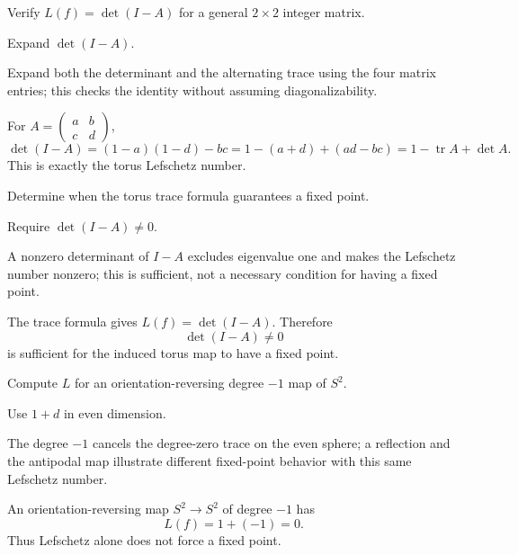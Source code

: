 \begin{exercise}\label{exr:viii35-15}
Verify $L(f)=\det(I-A)$ for a general $2\times2$ integer matrix.
\end{exercise}
\begin{hint}
Expand $\det(I-A)$.

Expand both the determinant and the alternating trace using the four matrix entries; this checks the identity without assuming diagonalizability.
\end{hint}
\begin{solution}
For \(A=\begin{pmatrix}a&b\\c&d\end{pmatrix}\),
\[
\det(I-A)=(1-a)(1-d)-bc
=1-(a+d)+(ad-bc)
=1-\operatorname{tr}A+\det A.
\]
This is exactly the torus Lefschetz number.
\end{solution}

\begin{exercise}\label{exr:viii35-16}
Determine when the torus trace formula guarantees a fixed point.
\end{exercise}
\begin{hint}
Require $\det(I-A)\ne0$.

A nonzero determinant of \(I-A\) excludes eigenvalue one and makes the Lefschetz number nonzero; this is sufficient, not a necessary condition for having a fixed point.
\end{hint}
\begin{solution}
The trace formula gives \(L(f)=\det(I-A)\). Therefore
\[
\det(I-A)\ne0
\]
is sufficient for the induced torus map to have a fixed point.
\end{solution}

\begin{exercise}\label{exr:viii35-17}
Compute $L$ for an orientation-reversing degree $-1$ map of $S^2$.
\end{exercise}
\begin{hint}
Use $1+d$ in even dimension.

The degree \(-1\) cancels the degree-zero trace on the even sphere; a reflection and the antipodal map illustrate different fixed-point behavior with this same Lefschetz number.
\end{hint}
\begin{solution}
An orientation-reversing map \(S^2\to S^2\) of degree \(-1\) has
\[
L(f)=1+(-1)=0.
\]
Thus Lefschetz alone does not force a fixed point.
\end{solution}

